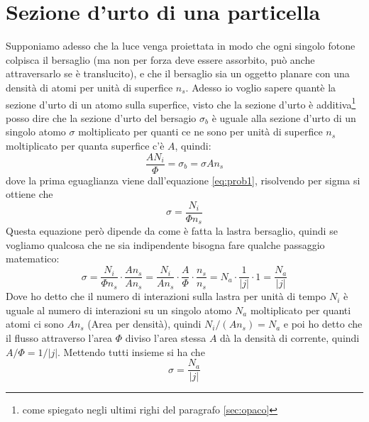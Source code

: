 \documentclass[11pt,a4paper]{article}
\begin{document}
	\section{Sezione d'urto di una particella}
		Supponiamo adesso che la luce venga proiettata in modo che ogni singolo fotone colpisca il bersaglio (ma non per forza deve essere assorbito, può anche attraversarlo se è translucito), e che il bersaglio sia un oggetto planare con una densità di atomi per unità di superfice $n_s$.\newline
		Adesso io voglio sapere quantè la sezione d'urto di un atomo sulla superfice, visto che la sezione d'urto è additiva\footnote{come spiegato negli ultimi righi del paragrafo \ref{sec:opaco}} posso dire che la sezione d'urto del bersagio $\sigma_b$ è uguale alla sezione d'urto di un singolo atomo $\sigma$ moltiplicato per quanti ce ne sono per unità di superfice $n_s$ moltiplicato per quanta superfice c'è $A$, quindi:
		\[
			\frac{AN_i}\Phi=\sigma_b=\sigma A n_s
		\]
		dove la prima eguaglianza viene dall'equazione \ref{eq:prob1}, risolvendo per sigma si ottiene che 
		\begin{equation}
			\sigma=\frac{N_i}{\Phi n_s}
		\end{equation}
		Questa equazione però dipende da come è fatta la lastra bersaglio, quindi se vogliamo qualcosa che ne sia indipendente bisogna fare qualche passaggio matematico:
		\[
			\sigma=\frac{N_i}{\Phi n_s}\cdot \frac{An_s}{An_s}=
			\frac{N_i}{An_s}\cdot\frac A\Phi\cdot \frac {n_s}{n_s}=
			N_a\cdot \frac1{|j|}\cdot 1=\frac{N_a}{|j|}
		\]
		Dove ho detto che il numero di interazioni sulla lastra per unità di tempo $N_i$ è uguale al numero di interazioni su un singolo atomo $N_a$ moltiplicato per quanti atomi ci sono $An_s$ (Area per densità), quindi $N_i/(An_s)=N_a$ e poi ho detto che il flusso attraverso l'area $\Phi$ diviso l'area stessa $A$ dà la densità di corrente, quindi $A/\Phi=1/|j|$.\newline
		Mettendo tutti insieme si ha che 
		\begin{equation}
			\sigma=\frac{N_a}{|j|}
		\end{equation}
\end{document}

